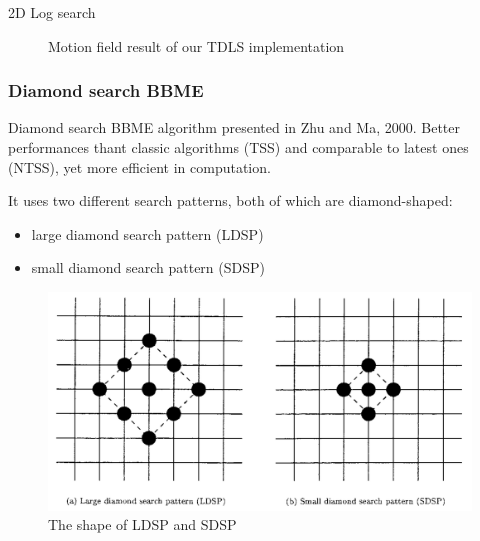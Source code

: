 \documentclass[aspectratio=1610,xcolor=dvipsnames]{beamer}
\begin{document}
\begin{frame}{2D Log search}
\begin{figure}
\begin{minipage}{.45\textwidth}
            \label{fig:bbme-2-res}
		\end{minipage}
        \label{fig:bbme-2}
        \caption{Motion field result of our TDLS implementation}
	\end{figure}
\end{frame}

\subsubsection*{Diamond search BBME}
\begin{frame}{Diamond search}
	BBME algorithm presented in Zhu and Ma, 2000. Better performances thant classic algorithms (TSS) and comparable to latest ones (NTSS), yet more efficient in computation.
    \bigskip
    
    It uses two different search patterns, both of which are diamond-shaped:
    \begin{itemize}
        \item large diamond search pattern (LDSP)
        \item small diamond search pattern (SDSP)
    \end{itemize}
    \begin{figure}
        \centering
        \includegraphics[keepaspectratio,width=.5\linewidth]{images/ds-search-patterns.png}
        \caption{The shape of LDSP and SDSP}
    \end{figure}
\end{frame}
\end{document}
